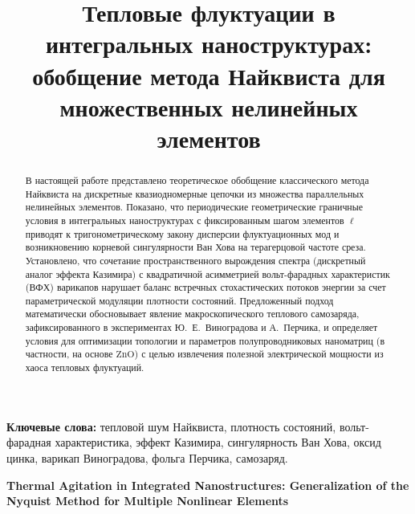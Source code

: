 \documentclass[12pt,a4paper]{article}
\begin{document}

\title{\textbf{Тепловые флуктуации в интегральных наноструктурах: обобщение метода Найквиста для множественных нелинейных элементов}}
\author{}
\date{}

\maketitle

\begin{abstract}
В настоящей работе представлено теоретическое обобщение классического метода Найквиста на дискретные квазиодномерные цепочки из множества параллельных нелинейных элементов. Показано, что периодические геометрические граничные условия в интегральных наноструктурах с фиксированным шагом элементов $\ell$ приводят к тригонометрическому закону дисперсии флуктуационных мод и возникновению корневой сингулярности Ван Хова на терагерцовой частоте среза. Установлено, что сочетание пространственного вырождения спектра (дискретный аналог эффекта Казимира) с квадратичной асимметрией вольт-фарадных характеристик (ВФХ) варикапов нарушает баланс встречных стохастических потоков энергии за счет параметрической модуляции плотности состояний. Предложенный подход математически обосновывает явление макроскопического теплового самозаряда, зафиксированного в экспериментах Ю.~Е.~Виноградова и А.~Перчика, и определяет условия для оптимизации топологии и параметров полупроводниковых наноматриц (в частности, на основе $\text{ZnO}$) с целью извлечения полезной электрической мощности из хаоса тепловых флуктуаций.
\end{abstract}

\textbf{Ключевые слова:} тепловой шум Найквиста, плотность состояний, вольт-фарадная характеристика, эффект Казимира, сингулярность Ван Хова, оксид цинка, варикап Виноградова, фольга Перчика, самозаряд.

\vspace{1cm}

\begin{center}
\large\textbf{Thermal Agitation in Integrated Nanostructures: Generalization of the Nyquist Method for Multiple Nonlinear Elements}
\end{center}
\end{document}

